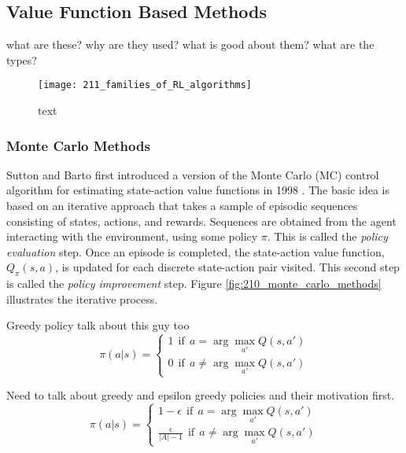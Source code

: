 \subsection{Value Function Based Methods}
what are these? why are they used? what is good about them? what are the types?

\begin{figure}[h]
	\centering
	\texttt{[image: 211\_families\_of\_RL\_algorithms]}
	\caption{text}
	\label{fig:211_families_of_RL_algorithms}
\end{figure}

\subsubsection{Monte Carlo Methods}
Sutton and Barto first introduced a version of the Monte Carlo (MC) control algorithm for estimating state-action value functions in 1998 \cite{Sutton2018}. The basic idea is based on an iterative approach that takes a sample of episodic sequences consisting of states, actions, and rewards. Sequences are obtained from the agent interacting with the environment, using some policy $\pi$. This is called the \textit{policy evaluation} step. Once an episode is completed, the state-action value function, $Q_{\pi}(s,a)$, is updated for each discrete state-action pair visited. This second step is called the \textit{policy improvement} step. Figure \ref{fig:210_monte_carlo_methods} illustrates the iterative process.

Greedy policy talk about this guy too
\begin{equation}
	\pi (a | s) = %
	   \begin{cases}
	   		1 \ \ \text{if} \ \ a = \arg\max_{a'} Q(s,a') \\
	   		0 \ \ \text{if} \ \ a \neq \arg\max_{a'} Q(s,a')
	   \end{cases}
\end{equation}


Need to talk about greedy and epsilon greedy policies and their motivation first.
\begin{equation}
   \pi (a | s) = %
   \begin{cases}
   		1 - \epsilon \ \ \text{if} \ \ a = \arg\max_{a'} Q(s,a') \\
   		\frac{\epsilon}{|A|-1} \ \ \text{if} \ \ a \neq \arg\max_{a'} Q(s,a')
   \end{cases}
\end{equation}



